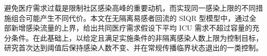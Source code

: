 避免医疗需求过载是限制社区感染高峰的重要动机，而实现同一感染上限的不同措施组合可能产生不同代价。本文在无隔离易感者回流的 SIQR 型模型中，通过全部新增感染流量的上界，给出共同医疗需求假设下平均 ICU 需求不超过容量的充分条件。在此基础上，以给定且满足实施条件的非隔离感染人数上限为控制目标，研究首次达到阈值后保持感染人数不变、并在常规传播临界状态退出的一类控制。
